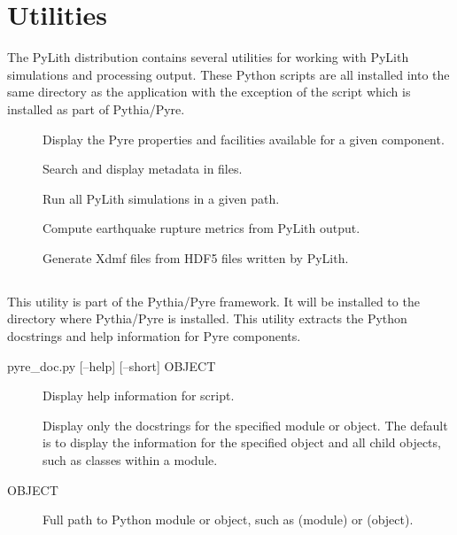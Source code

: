 \section{Utilities}

The PyLith distribution contains several utilities for working with PyLith simulations and processing output.
These Python scripts are all installed into the same  directory as the  application with the exception of the  script which is installed as part of Pythia/Pyre.

\begin{description}
  \item[] Display the Pyre properties and facilities available for a given component.
  \item[] Search and display metadata in  files.
  \item[] Run all PyLith simulations in a given path.
  \item[] Compute earthquake rupture metrics from PyLith output.
  \item[] Generate Xdmf files from HDF5 files written by PyLith.
\end{description}
  
\subsection{}

This utility is part of the Pythia/Pyre framework.
It will be installed to the  directory where Pythia/Pyre is installed.
This utility extracts the Python docstrings and help information for Pyre components.


\begin{shell}
pyre_doc.py [--help] [--short] OBJECT
\end{shell}

\begin{description}
\item[] Display help information for script.
\item[] Display only the docstrings for the specified module or object. The default is to display the information for the specified object and all child objects, such as classes within a module.
\item[OBJECT] Full path to Python module or object, such as  (module) or  (object).
\end{description}

